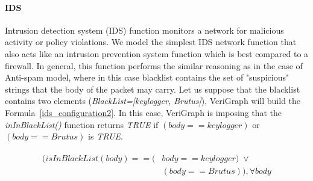 \paragraph{IDS}
Intrusion detection system (IDS) function monitors a network for malicious activity or policy violations. We model the simplest IDS network function that also acts like an intrusion prevention system function which is best compared to a firewall. In general, this function performs the similar reasoning as in the case of Anti-spam model, where in this case blacklist contains the set of "suspicious" strings that the body of the packet may carry. Let us suppose that the blacklist contains two elements (\textit{BlackList=[keylogger, Brutus]}), VeriGraph will build the Formula~\ref{ids_configuration2}. In this case, VeriGraph is imposing that the \textit{inInBlackList()} function returns \textit{TRUE} if \textit{$(body == keylogger)$} or \textit{$(body == Brutus)$} is \textit{TRUE}. 

\begin{figure}[h]
		{\footnotesize
			\begin{subequations}
				\begin{align}
					\begin{split}
						\label{ids_configuration2}
						(isInBlackList(body) == (& body == keylogger) \; \vee \\
						& (body == Brutus)), \forall body
					\end{split}
				\end{align}
			\end{subequations}
		}%
\end{figure}


